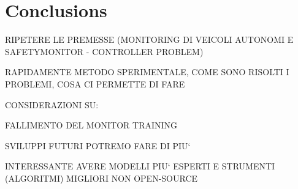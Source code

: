 \chapter{Conclusions}


RIPETERE LE PREMESSE (MONITORING DI VEICOLI AUTONOMI E SAFETYMONITOR - CONTROLLER PROBLEM)

RAPIDAMENTE METODO SPERIMENTALE, COME SONO RISOLTI I PROBLEMI, COSA CI PERMETTE DI FARE

CONSIDERAZIONI SU:

FALLIMENTO DEL MONITOR TRAINING

SVILUPPI FUTURI POTREMO FARE DI PIU`

INTERESSANTE AVERE MODELLI PIU` ESPERTI E STRUMENTI (ALGORITMI) MIGLIORI NON OPEN-SOURCE